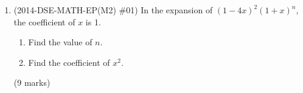 \documentclass[12pt]{article}
\begin{document}
\begin{enumerate}
        \hrulefill
        
        \hrulefill
        
        \hrulefill
        
        \hrulefill
        
        \hrulefill
        
        \hrulefill
        
        \hrulefill
        
        \hrulefill
        
        \hrulefill
        
        \hrulefill
        
        \hrulefill
        
        \hrulefill
        
        \hrulefill
        
        \hrulefill
        
        \hrulefill
        
        \hrulefill
        
        \hrulefill
        
        \hrulefill
        
        \hrulefill
        
        \hrulefill
        
        \hrulefill
        
        \hrulefill
        
        \hrulefill
        
        \hrulefill
        
        \hrulefill

    \pagebreak
        \item (2014-DSE-MATH-EP(M2) \#01) In the expansion of $(1-4x)^2(1+x)^n$, the coefficient of $x$ is 1.\begin{enumerate}
            \item Find the value of $n$.
            \item Find the coefficient of $x^2$.
        \end{enumerate}\hfill(9 marks)
            
            \hrulefill
            
            \hrulefill
            
            \hrulefill
            
            \hrulefill
            
            \hrulefill
            
            \hrulefill
            

\end{enumerate}
\end{document}
